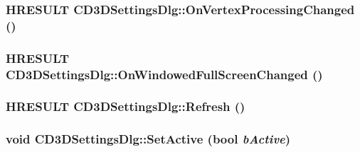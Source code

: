 \label{class_c_d3_d_settings_dlg_a37daa5c226dfa883b9bd9675f587188d}
\hypertarget{class_c_d3_d_settings_dlg_a3462ae5f6053ed30ce6ce269ca155c82}{
\subsubsection[{OnVertexProcessingChanged}]{\setlength{\rightskip}{0pt plus 5cm}HRESULT CD3DSettingsDlg::OnVertexProcessingChanged ()}}
\label{class_c_d3_d_settings_dlg_a3462ae5f6053ed30ce6ce269ca155c82}
\hypertarget{class_c_d3_d_settings_dlg_ae6c060173543d659cf6e4d810971c3ee}{
\subsubsection[{OnWindowedFullScreenChanged}]{\setlength{\rightskip}{0pt plus 5cm}HRESULT CD3DSettingsDlg::OnWindowedFullScreenChanged ()}}
\label{class_c_d3_d_settings_dlg_ae6c060173543d659cf6e4d810971c3ee}
\hypertarget{class_c_d3_d_settings_dlg_ae7602b7c1fc461fdc997c40de550ccbe}{
\subsubsection[{Refresh}]{\setlength{\rightskip}{0pt plus 5cm}HRESULT CD3DSettingsDlg::Refresh ()}}
\label{class_c_d3_d_settings_dlg_ae7602b7c1fc461fdc997c40de550ccbe}
\hypertarget{class_c_d3_d_settings_dlg_a78ee87995db6417e18e597610f119212}{
\subsubsection[{SetActive}]{\setlength{\rightskip}{0pt plus 5cm}void CD3DSettingsDlg::SetActive (bool {\em bActive})}}
